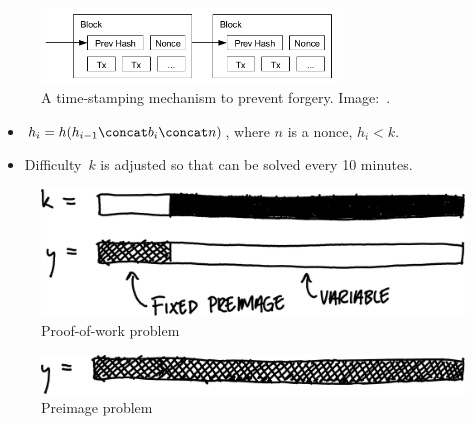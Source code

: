 \begin{frame}
  \begin{figure}
    \includegraphics[width=0.7\textwidth]{fig/bitcoin-pow.png}
    \caption{A time-stamping mechanism to prevent forgery.
    Image:~\cite{Nakamoto2008bap}.}
  \end{figure}
  
  \begin{solution}
    \begin{itemize}
      \item \(h_i = h(h_{i-1}\concat b_i\concat n)\),
        where \(n\) is a nonce, \(h_i < k\).
    \end{itemize}
  \end{solution}

  \pause

  \begin{remark}
    \begin{itemize}
      \item Difficulty~\(k\) is adjusted so that can be solved every 
        10 minutes.
    \end{itemize}
  \end{remark}
\end{frame}

\begin{frame}
  \begin{figure}
    \centering
    \includegraphics[width=0.8\columnwidth]{fig/pow.pdf}
    \caption{Proof-of-work problem}
  \end{figure}
\end{frame}

\begin{frame}
  \begin{figure}
    \centering
    \includegraphics[width=0.8\columnwidth]{fig/preimage.pdf}
    \caption{Preimage problem}
  \end{figure}
\end{frame}

